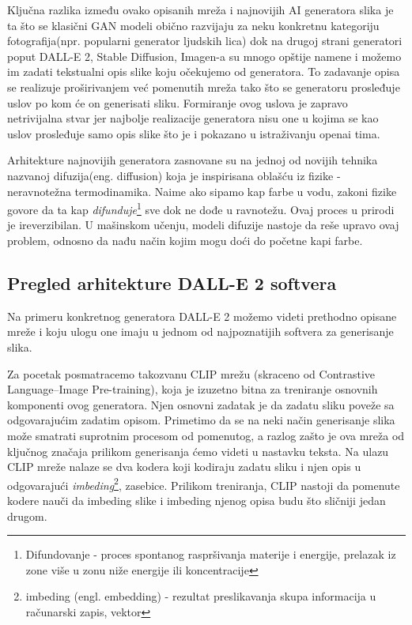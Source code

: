 \documentclass[12pt, letterpaper]{article}
\begin{document}
Ključna razlika između ovako opisanih mreža i najnovijih AI generatora slika je ta što se klasični GAN modeli obično razvijaju za neku konkretnu kategoriju fotografija(npr. popularni generator ljudskih lica)\cite{gen1} dok na drugoj strani generatori poput DALL-E 2, Stable Diffusion, Imagen-a su mnogo opštije namene i možemo im zadati tekstualni opis slike koju očekujemo od generatora. To zadavanje opisa se realizuje proširivanjem već pomenutih mreža tako što se generatoru prosleđuje uslov po kom će on generisati sliku.\cite{openai_dali, openai_glide, asembli} 
Formiranje ovog uslova je zapravo netrivijalna stvar jer najbolje realizacije generatora nisu one u kojima se kao uslov prosleđuje samo opis slike što je i pokazano u istraživanju openai tima.\cite{openai_dali}

Arhitekture najnovijih generatora zasnovane su na jednoj od novijih tehnika nazvanoj difuzija(eng. diffusion) koja je inspirisana oblašću iz fizike - neravnotežna termodinamika. Naime ako sipamo kap farbe u vodu, zakoni fizike govore da ta kap \textit{difunduje}\footnote{Difundovanje - proces spontanog raspršivanja materije i energije, prelazak iz zone više u zonu niže energije ili koncentracije} sve dok ne dođe u ravnotežu. Ovaj proces u prirodi je ireverzibilan. U mašinskom učenju, modeli difuzije nastoje da reše upravo ovaj problem, odnosno da nađu način kojim mogu doći do početne kapi farbe.\cite{asembli}

\subsection{Pregled arhitekture DALL-E 2 softvera}

Na primeru konkretnog generatora DALL-E 2 možemo videti prethodno opisane mreže i koju ulogu one imaju u jednom od najpoznatijih softvera za generisanje slika.

Za pocetak posmatracemo takozvanu CLIP mrežu (skraceno od Contrastive Language–Image Pre-training), koja je izuzetno bitna za treniranje osnovnih komponenti ovog generatora. Njen osnovni zadatak je da zadatu sliku poveže sa odgovarajućim zadatim opisom. Primetimo da se na neki način generisanje slika može smatrati suprotnim procesom od pomenutog, a razlog zašto je ova mreža od ključnog značaja prilikom generisanja ćemo videti u nastavku teksta. Na ulazu CLIP mreže nalaze se dva kodera koji kodiraju zadatu sliku i njen opis u odgovarajući \textit{imbeding}\footnote{imbeding (engl. embedding) - rezultat preslikavanja skupa informacija u računarski zapis, vektor}, zasebice. Prilikom treniranja, CLIP nastoji da pomenute kodere nauči da imbeding slike i imbeding njenog opisa budu što sličniji jedan drugom.\cite{clip, openai_dali}
\end{document}
